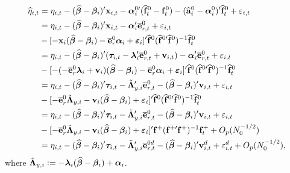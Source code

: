 \documentclass[12pt,fleqn]{article}
\begin{document}
\begin{align}
\widehat \eta_{i,t} & = \eta_{i,t} - (\widehat{\boldsymbol{\beta}}-\boldsymbol{\beta}_i)'\mathbf{x}_{i,t} - \boldsymbol{\alpha}_i^{0\prime}(\widehat{\mathbf{f}}_t^0-\mathbf{f}_t^0) - (\widehat{\mathbf{a}}_i^{0} - \boldsymbol{\alpha}_i^0)'\widehat{\mathbf{f}}_t^0  + \varepsilon_{i,t}\notag\\
& = \eta_{i,t} - (\widehat{\boldsymbol{\beta}}-\boldsymbol{\beta}_i)'\mathbf{x}_{i,t} - \boldsymbol{\alpha}_i'\overline{\mathbf{e}}_{r,t}^0 + \varepsilon_{i,t} \notag\\
& - [ -\mathbf{x}_{i}(\widehat{\boldsymbol{\beta}}-\boldsymbol{\beta}_i)  - \overline{\mathbf{e}}_{r}^0\boldsymbol{\alpha}_i +  \boldsymbol{\varepsilon}_{i} ]' \widehat{\mathbf{f}}^{0} (\widehat{\mathbf{f}}^{0\prime}\widehat{\mathbf{f}}^0)^{-1}\widehat{\mathbf{f}}_t^0  \notag\\
& = \eta_{i,t} -(\widehat{\boldsymbol{\beta}}-\boldsymbol{\beta}_i)'(\boldsymbol{\tau}_{i,t}  - \boldsymbol{\lambda}_i'\overline{\mathbf{e}}_{r,t}^0  + \mathbf{v}_{i,t}) - \boldsymbol{\alpha}_i'\overline{\mathbf{e}}_{r,t}^0 + \varepsilon_{i,t}\notag\\
& - [ -(- \overline{\mathbf{e}}_{r}^0\boldsymbol{\lambda}_i  + \mathbf{v}_i)(\widehat{\boldsymbol{\beta}}-\boldsymbol{\beta}_i) - \overline{\mathbf{e}}_{r}^0\boldsymbol{\alpha}_i +  \boldsymbol{\varepsilon}_{i} ]' \widehat{\mathbf{f}}^{0} (\widehat{\mathbf{f}}^{0\prime}\widehat{\mathbf{f}}^0)^{-1}\widehat{\mathbf{f}}_t^0 \notag\\
& = \eta_{i,t} -(\widehat{\boldsymbol{\beta}}-\boldsymbol{\beta}_i)'\boldsymbol{\tau}_{i,t} - \tilde{\boldsymbol{\Lambda}}_{y,i}'\overline{\mathbf{e}}_{r,t}^0 - (\widehat{\boldsymbol{\beta}}-\boldsymbol{\beta}_i)'\mathbf{v}_{i,t} + \varepsilon_{i,t}  \notag\\
& - [ - \overline{\mathbf{e}}_{r}^0\tilde{\boldsymbol{\Lambda}}_{y,i} - \mathbf{v}_i(\widehat{\boldsymbol{\beta}}-\boldsymbol{\beta}_i)+  \boldsymbol{\varepsilon}_{i} ]' \widehat{\mathbf{f}}^{0} (\widehat{\mathbf{f}}^{0\prime}\widehat{\mathbf{f}}^0)^{-1}\widehat{\mathbf{f}}_t^0 \notag\\
& = \eta_{i,t} -(\widehat{\boldsymbol{\beta}}-\boldsymbol{\beta}_i)'\boldsymbol{\tau}_{i,t} - \tilde{\boldsymbol{\Lambda}}_{y,i}'\overline{\mathbf{e}}_{r,t}^0 - (\widehat{\boldsymbol{\beta}}-\boldsymbol{\beta}_i)'\mathbf{v}_{i,t} + \varepsilon_{i,t}  \notag\\
& - [ - \overline{\mathbf{e}}_{r}^0\tilde{\boldsymbol{\Lambda}}_{y,i} - \mathbf{v}_i(\widehat{\boldsymbol{\beta}}-\boldsymbol{\beta}_i)+  \boldsymbol{\varepsilon}_{i} ]' \mathbf{f}^{+} (\mathbf{f}^{+\prime}\mathbf{f}^+)^{-1}\mathbf{f}_t^+ + O_p(N_0^{-1/2})\notag\\
& = \eta_{i,t} -(\widehat{\boldsymbol{\beta}}-\boldsymbol{\beta}_i)'\boldsymbol{\tau}_{i,t} - \tilde{\boldsymbol{\Lambda}}_{y,i}'\overline{\mathbf{e}}_{r,t}^{0d} - (\widehat{\boldsymbol{\beta}}-\boldsymbol{\beta}_i)'\mathbf{v}_{i,t}^d + \varepsilon_{i,t}^d + O_p(N_0^{-1/2}),
\end{align}
where $\tilde{\boldsymbol{\Lambda}}_{y,i} :=  -\boldsymbol{\lambda}_i(\widehat{\boldsymbol{\beta}}-\boldsymbol{\beta}_i) + \boldsymbol{\alpha}_i$.
\end{document}
